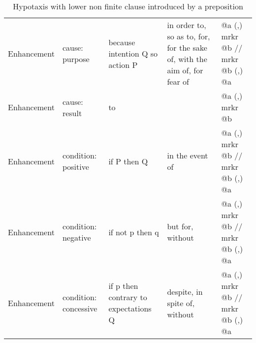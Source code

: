 \begin{landscape}
\begin{table}[]
{\begin{tabulary}{2\textwidth}{p{7em}p{10em}p{10em}p{18em}p{18em}}
        Enhancement & cause: purpose & because intention Q so action P & in order to, so as to, for, for the sake of, with the aim of, for fear of & @a (,) mrkr @b // mrkr @b (,) @a \\
        Enhancement & cause: result & to &  & @a (,) mrkr @b \\
        Enhancement & condition: positive & if P then Q & in the event of & @a (,) mrkr @b // mrkr @b (,) @a \\
        Enhancement & condition: negative & if not p then q & but for, without & @a (,) mrkr @b // mrkr @b (,) @a \\
        Enhancement & condition: concessive & if p then contrary to expectations Q & despite, in spite of, without & @a (,) mrkr @b // mrkr @b (,) @a \\ \bottomrule
        \end{tabulary}%
    }
    \caption{Hypotaxis with lower non finite clause introduced by a preposition}
    \label{tab:hypotaxis-non-finite-preposition}
    \end{table}
    \end{landscape}